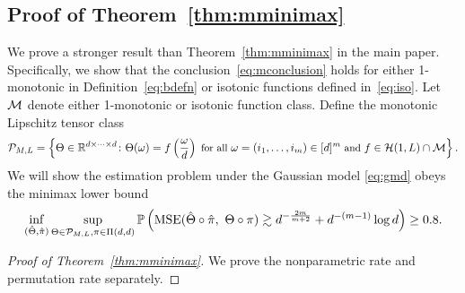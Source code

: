 \documentclass[12pt]{article}
\theoremstyle{definition}
\begin{document}
{\color{blue}
\subsection{Proof of Theorem~\ref{thm:mminimax}}\label{sec:genminimax}
We prove a stronger result than Theorem~\ref{thm:mminimax} in the main paper. Specifically, we show that the conclusion~\eqref{eq:mconclusion} holds for either 1-monotonic in Definition~\ref{eq:bdefn} or isotonic functions defined in~\eqref{eq:iso}. Let $\mathcal{M}$ denote either 1-monotonic or isotonic function class. Define the monotonic Lipschitz tensor class 
\[
{\small \mathcal{P}_{M,L} = \left\{\Theta\in\mathbb{R}^{d\times \cdots \times d} \colon\Theta(\omega) = f\left({\omega \over d}\right) \text{ for all } \omega=(i_1,\ldots,i_m) \in[d]^m \text{ and } f\in\mathcal{H}(1,L)\cap \mathcal{M}\right\}.}
\]
We will show the estimation problem under the Gaussian model \eqref{eq:gmd} obeys the minimax lower bound
\begin{align}
    \inf_{(\hat\Theta,\hat\pi)}\sup_{\Theta\in\tP_{M,L},\pi\in\Pi(d,d)}\mathbb{P}\left(\textup{MSE}(\hat\Theta\circ\hat\pi,\ \Theta\circ\pi) \gtrsim d^{-{2m\over m+2}}+ d^{-(m-1)}\log d \right) \geq 0.8.
\end{align}


\begin{proof}[Proof of Theorem~\ref{thm:mminimax}]
We prove the nonparametric rate and permutation rate separately. 

\end{proof}}
\end{document}
